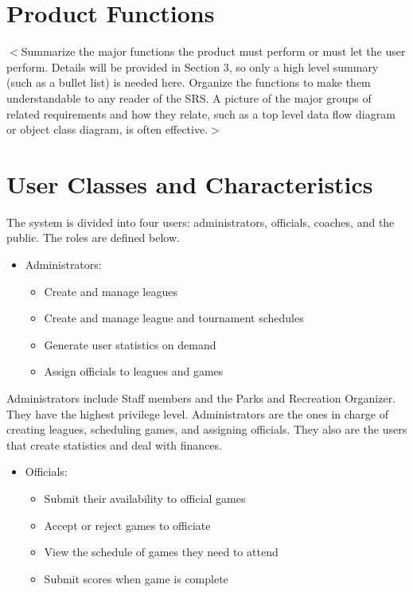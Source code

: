 \documentclass{scrreprt}
\begin{document}
\section{Product Functions}
$<$Summarize the major functions the product must perform or must let the user 
perform. Details will be provided in Section 3, so only a high level summary 
(such as a bullet list) is needed here. Organize the functions to make them 
understandable to any reader of the SRS. A picture of the major groups of 
related requirements and how they relate, such as a top level data flow diagram 
or object class diagram, is often effective.$>$

\section{User Classes and Characteristics}
The system is divided into four users: administrators, officials, coaches, and the public. The roles are defined below.
\begin{itemize}
    \item Administrators:
    \begin{itemize}
        \item Create and manage leagues
        \item Create and manage league and tournament schedules 
        \item Generate user statistics on demand
        \item Assign officials to leagues and games
    \end{itemize}
\end{itemize}
Administrators include Staff members and the Parks and Recreation Organizer.  They have the highest privilege level. Administrators are the ones in charge of creating leagues, scheduling games, and assigning officials. They also are the users that create statistics and deal with finances.
\begin{itemize}
    \item Officials:
    \begin{itemize}
        \item Submit their availability to official games
        \item Accept or reject games to officiate
        \item View the schedule of games they need to attend
        \item Submit scores when game is complete
    \end{itemize}
\end{itemize}
\end{document}
